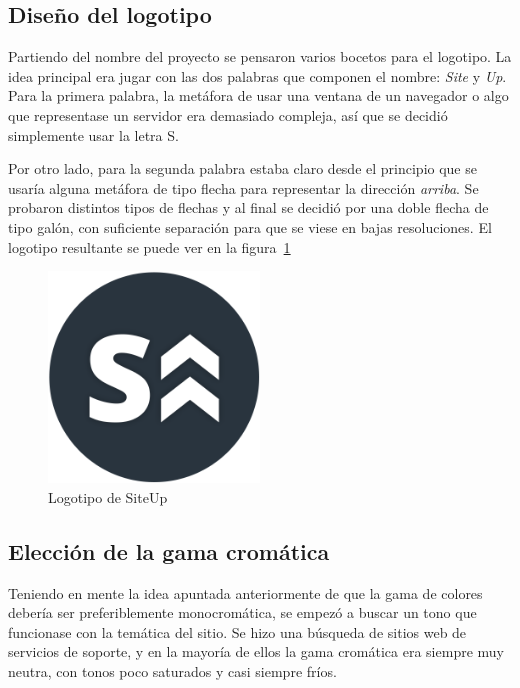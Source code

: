 \subsection{Diseño del logotipo}
\label{subsec:logotipo}

Partiendo del nombre del proyecto se pensaron varios bocetos para el
logotipo. La idea principal era jugar con las dos palabras que componen el
nombre: \textit{Site} y \textit{Up}. Para la primera palabra, la metáfora de
usar una ventana de un navegador o algo que representase un servidor era
demasiado compleja, así que se decidió simplemente usar la letra S. 

Por otro lado, para la segunda palabra estaba claro desde el principio que se
usaría alguna metáfora de tipo flecha para representar la dirección
\textit{arriba}. Se probaron distintos tipos de flechas y al final se decidió
por una doble flecha de tipo galón, con suficiente separación para que se viese
en bajas resoluciones. El logotipo resultante se puede ver en la
figura~\ref{fig:logotipo}

\begin{figure}[H]
  \centering
  \includegraphics[width=0.5\textwidth]{5_diseno/logo.png}
  \caption{Logotipo de SiteUp}
  \label{fig:logotipo}
\end{figure}

\subsection{Elección de la gama cromática}

Teniendo en mente la idea apuntada anteriormente de que la gama de colores
debería ser preferiblemente monocromática, se empezó a buscar un tono que
funcionase con la temática del sitio. Se hizo una búsqueda de sitios web de
servicios de soporte, y en la mayoría de ellos la gama cromática era siempre muy
neutra, con tonos poco saturados y casi siempre fríos.


